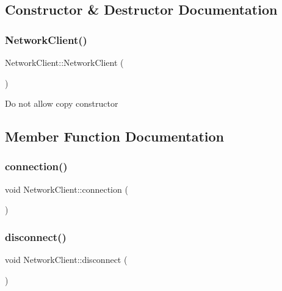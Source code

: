 \subsection{Constructor \& Destructor Documentation}
\mbox{\label{classNetworkClient_a0b95f7c2259c75cf108d5dc9021f3b0f}} 
\subsubsection{\texorpdfstring{Network\+Client()}{NetworkClient()}}
{\footnotesize\ttfamily Network\+Client\+::\+Network\+Client (\begin{DoxyParamCaption}\item[{const \hyperlink{classNetworkClient}{Network\+Client} \&}]{ }\end{DoxyParamCaption})\hspace{0.3cm}{\ttfamily [delete]}}

Do not allow copy constructor 

\subsection{Member Function Documentation}
\mbox{\label{classNetworkClient_a31ca2c82cc998bc0bccd1252705a86bd}} 
\subsubsection{\texorpdfstring{connection()}{connection()}}
{\footnotesize\ttfamily void Network\+Client\+::connection (\begin{DoxyParamCaption}{ }\end{DoxyParamCaption})}

\mbox{\label{classNetworkClient_a7f69f5c30fd349d670fae18598737b86}} 
\subsubsection{\texorpdfstring{disconnect()}{disconnect()}}
{\footnotesize\ttfamily void Network\+Client\+::disconnect (\begin{DoxyParamCaption}{ }\end{DoxyParamCaption})}

